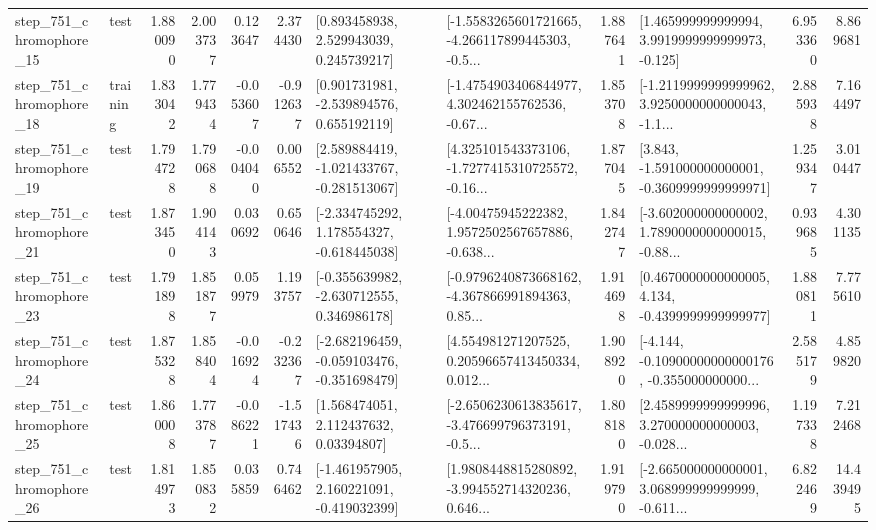 \begin{tabular}{llrrrrllrlrr}
  step\_751\_chromophore\_15 &      test &      1.880090 &    2.003737 &      0.123647 &  2.374430 &     [0.893458938, 2.529943039, 0.245739217] &  [-1.5583265601721665, -4.266117899445303, -0.5... &       1.887641 &    [1.465999999999994, 3.9919999999999973, -0.125] &            6.953360 &          8.869681 \\
  step\_751\_chromophore\_18 &  training &      1.833042 &    1.779434 &     -0.053607 & -0.912637 &    [0.901731981, -2.539894576, 0.655192119] &  [-1.4754903406844977, 4.302462155762536, -0.67... &       1.853708 &  [-1.2119999999999962, 3.9250000000000043, -1.1... &            2.885938 &          7.164497 \\
  step\_751\_chromophore\_19 &      test &      1.794728 &    1.790688 &     -0.004040 &  0.006552 &   [2.589884419, -1.021433767, -0.281513067] &  [4.325101543373106, -1.7277415310725572, -0.16... &       1.877045 &   [3.843, -1.591000000000001, -0.3609999999999971] &            1.259347 &          3.010447 \\
  step\_751\_chromophore\_21 &      test &      1.873450 &    1.904143 &      0.030692 &  0.650646 &   [-2.334745292, 1.178554327, -0.618445038] &  [-4.00475945222382, 1.9572502567657886, -0.638... &       1.842747 &  [-3.602000000000002, 1.7890000000000015, -0.88... &            0.939685 &          4.301135 \\
  step\_751\_chromophore\_23 &      test &      1.791898 &    1.851877 &      0.059979 &  1.193757 &   [-0.355639982, -2.630712555, 0.346986178] &  [-0.9796240873668162, -4.367866991894363, 0.85... &       1.914698 &   [0.4670000000000005, 4.134, -0.4399999999999977] &            1.880811 &          7.775610 \\
  step\_751\_chromophore\_24 &      test &      1.875328 &    1.858404 &     -0.016924 & -0.232367 &  [-2.682196459, -0.059103476, -0.351698479] &  [4.554981271207525, 0.20596657413450334, 0.012... &       1.908920 &  [-4.144, -0.10900000000000176, -0.355000000000... &            2.585179 &          4.859820 \\
  step\_751\_chromophore\_25 &      test &      1.860008 &    1.773787 &     -0.086221 & -1.517436 &      [1.568474051, 2.112437632, 0.03394807] &  [-2.6506230613835617, -3.476699796373191, -0.5... &       1.808180 &  [2.4589999999999996, 3.270000000000003, -0.028... &            1.197338 &          7.212468 \\
  step\_751\_chromophore\_26 &      test &      1.814973 &    1.850832 &      0.035859 &  0.746462 &   [-1.461957905, 2.160221091, -0.419032399] &  [1.9808448815280892, -3.994552714320236, 0.646... &       1.919790 &  [-2.665000000000001, 3.068999999999999, -0.611... &            6.822469 &         14.439495 \\

\end{tabular}
